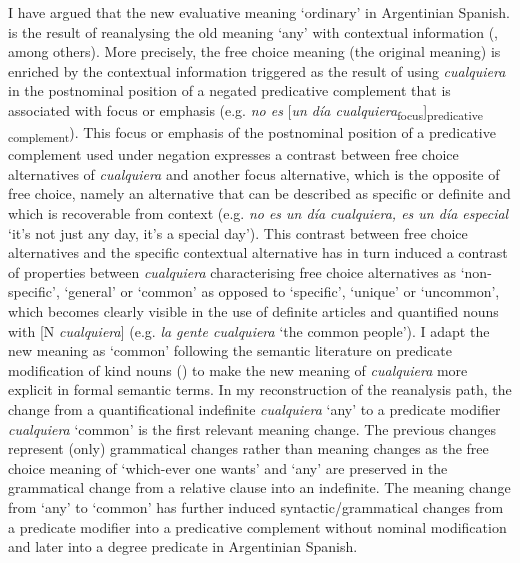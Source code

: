 {I have argued that the new evaluative meaning ‘ordinary’ in Argentinian Spanish. is the result of reanalysing the old meaning ‘any’ with contextual information
(\citealt{Blank1997,Traugott1989,Eckardt2006}, among others). More precisely, the free choice meaning (the original meaning) is enriched by the contextual information triggered as the result of using \textit{cualquiera} in the postnominal position of a negated predicative complement that is associated with focus or emphasis (e.g. \textit{no es} [\textit{un día cualquiera}\textsubscript{focus}]\textsubscript{predicative complement}}). This focus or emphasis of the postnominal position of a predicative complement used under negation expresses a contrast between free choice alternatives of \textit{cualquiera} and another focus alternative, which is the opposite of free choice, namely an alternative that can be described as specific or definite and which is recoverable from context (e.g. \textit{no es un día cualquiera, es un día especial} ‘it's not just any day, it's a special day’). This contrast between free choice alternatives and the specific contextual alternative has in turn induced a contrast of properties between \textit{cualquiera} characterising free choice alternatives as ‘non-specific’, ‘general’ or ‘common’ as opposed to ‘specific’, ‘unique’ or ‘uncommon’, which becomes clearly visible in the use of definite articles and quantified nouns with [N \textit{cualquiera}] (e.g. \textit{la gente cualquiera} ‘the common people’). I adapt the new meaning as ‘common’ following the semantic literature on predicate modification of kind nouns (\citealt{Carlson1977,GehrkeMcNally2015}) to make the new meaning of \textit{cualquiera} more explicit in formal semantic terms. In my reconstruction of the reanalysis path, the change from a quantificational indefinite \textit{cualquiera} ‘any’ to a predicate modifier \textit{cualquiera} ‘common’ is the first relevant meaning change. The previous changes represent (only) grammatical changes rather than meaning changes as the free choice meaning of ‘which-ever one wants’ and ‘any’ are preserved in the grammatical change from a relative clause into an indefinite. The meaning change from ‘any’ to ‘common’ has further induced syntactic/grammatical changes from a predicate modifier into a predicative complement without nominal modification and later into a degree predicate in Argentinian Spanish.
